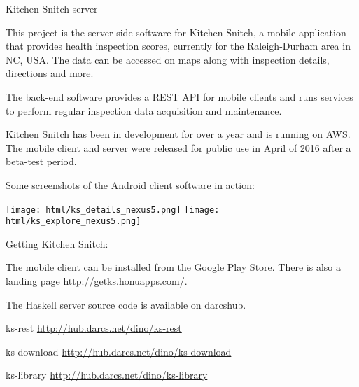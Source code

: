 \begin{hcarentry}[new]{Kitchen Snitch server}
\makeheader

This project is the server-side software for Kitchen Snitch, a mobile
application that provides health inspection scores, currently for the
Raleigh-Durham area in NC, USA. The data can be accessed on maps along with
inspection details, directions and more.

The back-end software provides a REST API for mobile clients and runs services
to perform regular inspection data acquisition and maintenance.

Kitchen Snitch has been in development for over a year and is running on AWS.
The mobile client and server were released for public use in April of 2016
after a beta-test period.

Some screenshots of the Android client software in action:

\begin{center}
\texttt{[image: html/ks\_details\_nexus5.png]}
\texttt{[image: html/ks\_explore\_nexus5.png]}
\end{center}

Getting Kitchen Snitch:

The mobile client can be installed from the
\href{https://play.google.com/store/apps/details?id=com.honu.ksnitch}{Google
Play Store}. There is also a landing page
\mbox{\url{http://getks.honuapps.com/}}.

The Haskell server source code is available on darcshub.

\FurtherReading
\begin{compactitem}
 \item ks-rest \url{http://hub.darcs.net/dino/ks-rest}
 \item ks-download \url{http://hub.darcs.net/dino/ks-download}
 \item ks-library \url{http://hub.darcs.net/dino/ks-library}
\end{compactitem}

\end{hcarentry}
